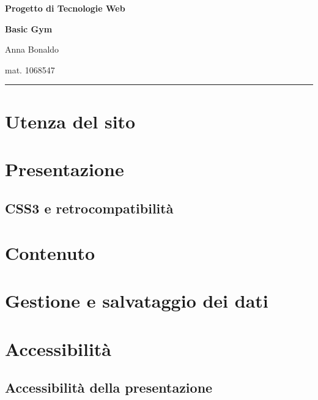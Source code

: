 \documentclass[12pt,a4paper]{article}
\title{\titoloDocumento}
\author{Anna Bonaldo}
\newcommand{\titoloDocumento}{Basic Gym}
\begin{document}
\begin{center}
	\[  \]
	\[  \]
	\[  \]

	\vspace{1cm}
	\begin{Large}
		\textbf{Progetto di Tecnologie Web}\\
		
	\end{Large}
\begin{Huge}
	\textbf{{\titoloDocumento}}\\
	\vspace{1cm}
\end{Huge}

    \begin{Large}
    	Anna Bonaldo \\
    \end{Large}
    mat. 1068547
    \vspace{1cm}
    \hrule

\end{center}
\vspace{1cm}



\begin{abstract}

\end{abstract}
	\newpage
	\tableofcontents
	
	\newpage
\section{Utenza del sito}
\section{Presentazione}
\subsection{CSS3 e retrocompatibilità}
\section{Contenuto}
\section{Gestione e salvataggio dei dati}
\section{Accessibilità}
\subsection{Accessibilità della presentazione}
\end{document}
